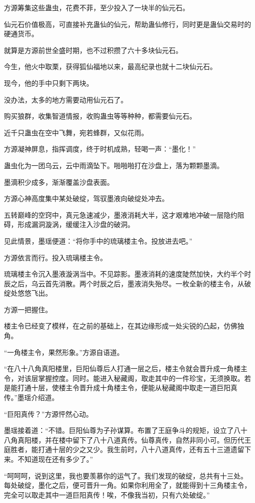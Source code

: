 \begin{this_body}
方源筹集这些蛊虫，花费不菲，至少投入了一块半的仙元石。

仙元石价值极高，可直接补充蛊仙的仙元，帮助蛊仙修行，同时更是蛊仙交易时的硬通货币。

就算是方源前世全盛时期，也不过积攒了六十多块仙元石。

今生，他火中取栗，获得狐仙福地以来，最高纪录也就十二块仙元石。

现今，他的手中只剩下两块。

没办法，太多的地方需要动用仙元石了。

购买狼群，收集智道情报，收购蛊虫等等种种，都需要仙元石。

近千只蛊虫在空中飞舞，宛若蜂群，又似花雨。

方源凝神屏息，指挥调度，终于时机成熟，轻喝一声：“墨化！”

蛊虫化为一团乌云，云中雨滴坠下。啪啪啪打在沙盘上，落为颗颗墨滴。

墨滴积少成多，渐渐覆盖沙盘表面。

方源心神高度集中某处破绽，驾驭墨液向破绽处冲去。

五转巅峰的空窍中，真元急速减少，墨液消耗大半，这才艰难地冲破一层隐约阻碍，形成漏洞漩涡，缓缓注入沙盘的破洞。

见此情景，墨瑶便道：“将你手中的琉璃楼主令。投放进去吧。”

方源依言而行。投入琉璃楼主令。

琉璃楼主令沉入墨液漩涡当中。不见踪影。墨液消耗的速度陡然加快，大约半个时辰之后，乌云首先消散。两个时辰之后，墨液消失殆尽。一枚全新的楼主令，从破绽处悠悠飞出。

方源一把握住。

楼主令已经变了模样，在之前的基础上，在其边缘形成一处尖锐的凸起，仿佛独角。

“一角楼主令，果然形象。”方源自语道。

“在八十八角真阳楼里，巨阳仙尊后人打通一层之后，楼主令就会晋升成一角楼主令，对该层掌握控度。同时。能进入秘藏阁，取走其中的一件珍宝，无须换取。若是能打通十层，使楼主令晋升成十角楼主令，便能从秘藏阁中取走一道巨阳真传。”墨瑶介绍道。

“巨阳真传？”方源怦然心动。

墨瑶接着道：“不错。巨阳仙尊为子孙谋算。布置了王庭争斗的规矩，设立了八十八角真阳楼，并在楼中留下了八十八道真传。仙尊真传，自然非同小可。但历代王庭胜者，能打通十层的少之又少。我生前时，八十八道真传，还有五十三道遗留下来。不知道现在还有多少了。”

“呵呵呵，说到这里，我也要羡慕你的运气了。我们发现的破绽，总共有十三处。每处破绽，墨化之后，便可晋升一角。如果你利用全了，就能得到十三角楼主令，完全可以取走其中一道巨阳真传！唉，不像我当初，只有六处破绽。”


\end{this_body}
